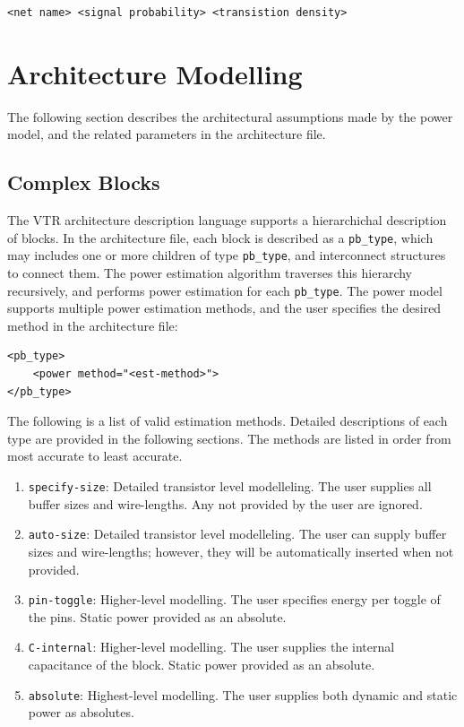 \documentclass[letterpaper,twoside,10pt]{article}
\begin{document}
\begin{BVerbatim}[bgcolor=LightGray, boxwidth=\textwidth] 
<net name> <signal probability> <transistion density>
\end{BVerbatim}
	

\newpage
\section{Architecture Modelling}
The following section describes the architectural assumptions made by the power model, and the related parameters in the architecture file.

\subsection{Complex Blocks} \label{sec:clbs}
The VTR architecture description language supports a hierarchichal description of blocks.  In the architecture file, each block is described as a \texttt{pb\_type}, which may includes one or more children of type \texttt{pb\_type}, and interconnect structures to connect them.  The power estimation algorithm traverses this hierarchy recursively, and performs power estimation for each \texttt{pb\_type}.  The power model supports multiple power estimation methods, and the user specifies the desired method in the architecture file: \newline
\begin{BVerbatim}[bgcolor=LightGray, boxwidth=\textwidth] 
<pb_type>
	<power method="<est-method>">
</pb_type>
\end{BVerbatim}

The following is a list of valid estimation methods. Detailed descriptions of each type are provided in the following sections.  The methods are listed in order from most accurate to least accurate. 
\begin{enumerate}
\item \texttt{specify-size}: Detailed transistor level modelleling. The user supplies all buffer sizes and wire-lengths.  Any not provided by the user are ignored. 
\item \texttt{auto-size}: Detailed transistor level modelleling. The user can supply buffer sizes and wire-lengths; however, they will be automatically inserted when not provided. 
\item \texttt{pin-toggle}: Higher-level modelling.  The user specifies energy per toggle of the pins.  Static power provided as an absolute.
\item \texttt{C-internal}: Higher-level modelling.  The user supplies the internal capacitance of the block.  Static power provided as an absolute.
\item \texttt{absolute}: Highest-level modelling.  The user supplies both dynamic and static power as absolutes.
\end{enumerate}
\end{document}
